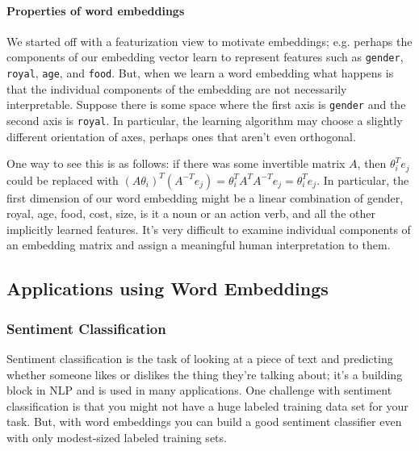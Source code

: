 \documentclass[12pt]{article}
\begin{document}
\paragraph{Properties of word embeddings} We started off with a featurization view to motivate embeddings; e.g. perhaps the components of our embedding vector learn to represent features such as \texttt{gender}, \texttt{royal}, \texttt{age}, and \texttt{food}. But, when we learn a word embedding what happens is that the individual components of the embedding are not necessarily interpretable. Suppose there is some space where the first axis is \texttt{gender} and the second axis is \texttt{royal}. In particular, the learning algorithm may choose a slightly different orientation of axes, perhaps ones that aren't even orthogonal.

\begin{figure}[h]
\end{figure}

One way to see this is as follows: if there was some invertible matrix $A$, then $\theta_i^T e_j$ could be replaced with $(A \theta_i)^T(A^{-T} e_j) = \theta_i^T A^T A^{-T} e_j = \theta_i^T e_j$. In particular, the first dimension of our word embedding might be a linear combination of gender, royal, age, food, cost, size,
is it a noun or an action verb, and all the other implicitly learned features. It's very difficult to examine individual components of an embedding matrix and assign a meaningful human interpretation to them.

\subsection{Applications using Word Embeddings}
\subsubsection{Sentiment Classification}
Sentiment classification is the task of looking at a piece of text and predicting whether someone likes or dislikes the thing they're talking about; it's a building block in NLP and is used in many applications. One challenge with sentiment classification is that you might not have a huge labeled training data set for your task. But, with word embeddings you can build a good sentiment classifier even with only modest-sized labeled training sets.
\end{document}

